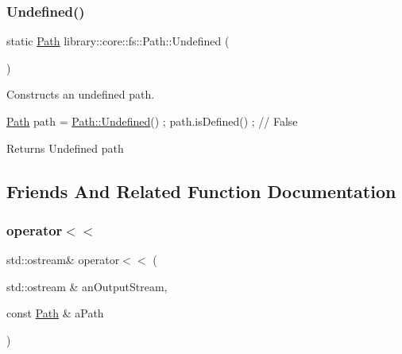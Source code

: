 \subsubsection{\texorpdfstring{Undefined()}{Undefined()}}
{\footnotesize\ttfamily static \hyperlink{classlibrary_1_1core_1_1fs_1_1_path}{Path} library\+::core\+::fs\+::\+Path\+::\+Undefined (\begin{DoxyParamCaption}{ }\end{DoxyParamCaption})\hspace{0.3cm}{\ttfamily [static]}}



Constructs an undefined path. 


\begin{DoxyCode}
\hyperlink{classlibrary_1_1core_1_1fs_1_1_path_aaba9a8e0153813f08f78f1c3275734a4}{Path} path = \hyperlink{classlibrary_1_1core_1_1fs_1_1_path_a89cddd92be70121f2537726d69ca6499}{Path::Undefined}() ;
path.isDefined() ; \textcolor{comment}{// False}
\end{DoxyCode}


\begin{DoxyReturn}{Returns}
Undefined path 
\end{DoxyReturn}


\subsection{Friends And Related Function Documentation}
\mbox{\label{classlibrary_1_1core_1_1fs_1_1_path_a87813ac3ede0b43b50ae6b9fdf0a2815}} 
\subsubsection{\texorpdfstring{operator$<$$<$}{operator<<}}
{\footnotesize\ttfamily std\+::ostream\& operator$<$$<$ (\begin{DoxyParamCaption}\item[{std\+::ostream \&}]{an\+Output\+Stream,  }\item[{const \hyperlink{classlibrary_1_1core_1_1fs_1_1_path}{Path} \&}]{a\+Path }\end{DoxyParamCaption})\hspace{0.3cm}{\ttfamily [friend]}}



